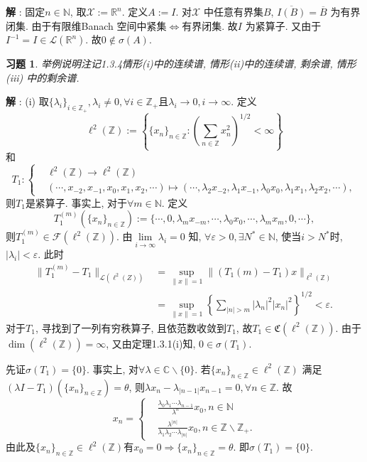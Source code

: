 \documentclass[UTF8,twoside]{ctexbook}
\newtheorem{exercise}{习题}[section]
\newcommand{\h}{\mathscr}
\newcommand{\kx}{\mathbb}
\numberwithin{equation}{section}
\begin{document}
	\noindent\textbf{解 }: 固定$n\in\kx N$, 取$\h X:=\kx R^n$. 定义$A:=I$. 对$\h X$ 中任意有界集$B$, $\overline{I(B)}=\overline{B}$ 为有界闭集. 由于有限维Banach 空间中紧集$\Longleftrightarrow$有界闭集. 故$I$ 为紧算子. 又由于$I^{-1}=I\in\h L(\kx R^n)$. 故$0\notin\sigma(A)$.

	\begin{exercise}
		举例说明注记1.3.4情形(i)中的连续谱, 情形(ii)中的连续谱, 剩余谱, 情形(iii) 中的剩余谱.
	\end{exercise}
	\noindent\textbf{解 }: (i) 取$\{\lambda_i\}_{i\in\kx Z_+}, \lambda_i\neq 0, \forall i\in\kx Z_+$且$\lambda_i\rightarrow 0, i\rightarrow\infty$. 定义
	\[
	\ell^2(\kx Z):=\left\{\{x_n\}_{n\in\kx Z}:\left(\sum_{n\in\kx Z}x_n^2\right)^{1/2}<\infty\right\}
	\]
	和
	\[
	T_1:\left\{
	\begin{aligned}
	&\ell^2(\kx Z)\rightarrow \ell^2(\kx Z)\\
	& (\cdots,x_{-2},x_{-1},x_0,x_1,x_2,\cdots)\mapsto (\cdots,\lambda_2 x_{-2},\lambda_1 x_{-1},\lambda_0 x_0,\lambda_1 x_1,\lambda_2 x_2,\cdots),
	\end{aligned}
	\right.
	\]
	则$T_1$是紧算子. 事实上, 对于$\forall m\in\kx N$. 定义
	\[
	T_1^{(m)}(\{x_n\}_{n\in\kx Z}):=\{\cdots,0,\lambda_m x_{-m},\cdots,\lambda_0 x_0,\cdots,\lambda_m x_m,0,\cdots\},
	\]
	则$T_1^{(m)}\in\h F(\ell^2(\kx Z))$. 由$\lim\limits_{i\rightarrow\infty}\lambda_i=0$ 知, $\forall \varepsilon > 0, \exists N^*\in\kx N$, 使当$i>N^*$时, $|\lambda_i|<\varepsilon$. 此时
	\[
	\begin{aligned}
	\|T_1^{(m)}-T_1\|_{\h L(\ell^2(Z))}
	&= \sup_{\|x\|=1}\|(T_1{(m)}-T_1)x\|_{\ell^2(\kx Z)}\\
	&= \sup_{\|x\|=1}\left\{\sum_{|n|>m}|\lambda_n|^2|x_n|^2\right\}^{1/2}<\varepsilon.
	\end{aligned}
	\]
	对于$T_1$, 寻找到了一列有穷秩算子, 且依范数收敛到$T_1$, 故$T_1\in\mathfrak C(\ell^2(\kx Z))$. 由于$\dim(\ell^2(\kx Z))=\infty$, 又由定理1.3.1(i)知, $0\in\sigma(T_1)$.

	先证$\sigma(T_1)=\{0\}$. 事实上, 对$\forall\lambda\in\kx C\backslash\{0\}$. 若$\{x_n\}_{n\in\kx Z}\in\ell^2(\kx Z)$ 满足$(\lambda I-T_1)(\{x_n\}_{n\in\kx Z})=\theta$, 则$\lambda x_n-\lambda_{|n-1|}x_{n-1}=0, \forall n\in\kx Z$. 故
	\[
	x_n=\left\{
	\begin{aligned}
	&\frac{\lambda_0\lambda_1\cdots\lambda_{n-1}}{\lambda^n}x_0,n\in\kx N\\
	&\frac{\lambda^{|n|}}{\lambda_1\lambda_2\cdots\lambda_{|n|}}x_0,n\in\kx Z\backslash\kx Z_+.
	\end{aligned}
	\right.
	\]
	由此及$\{x_n\}_{n\in\kx Z}\in\ell^2(\kx Z)$有$x_0=0\Longrightarrow\{x_n\}_{n\in\kx Z}=\theta$. 即$\sigma(T_1)=\{0\}$.
\end{document}
